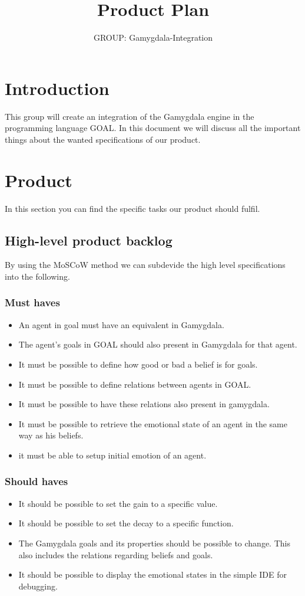 \documentclass[]{article}
\title{Product Plan}
\author{GROUP: Gamygdala-Integration}
\begin{document}
\maketitle
\pagebreak
\tableofcontents
\pagebreak
\section{Introduction}
This group will create an integration of the \gls{Gamygdala} engine in the programming language \gls{GOAL}. In this document we will discuss all the important things about the wanted specifications of our product.
\section{Product}
In this section you can find the specific tasks our product should fulfil.
\subsection{High-level product backlog}
By using the \gls{MoSCoW} method we can subdevide the high level specifications into the following.
\subsubsection*{Must haves}
\begin{itemize}
	\item An \gls{agent} in goal must have an equivalent in Gamygdala.
	\item The agent's goals in GOAL should also present in Gamygdala for that agent. 
	\item It must be possible to define how good or bad a belief is for goals.
	\item It must be possible to define relations between agents in GOAL.
	\item It must be possible to have these relations also present in gamygdala.
	\item It must be possible to retrieve the emotional state of an agent in the same way as his beliefs.
	\item it must be able to setup initial emotion of an agent.
\end{itemize}
 
\subsubsection*{Should haves}

\begin{itemize}
	\item It should be possible to set the gain to a specific value.
	\item It should be possible to set the decay to a specific function.
	\item The  Gamygdala goals and its properties should be possible to change. This also includes the relations regarding beliefs and goals.
	\item It should be possible to display the emotional states in the simple IDE for debugging.
\end{itemize}
\end{document}
